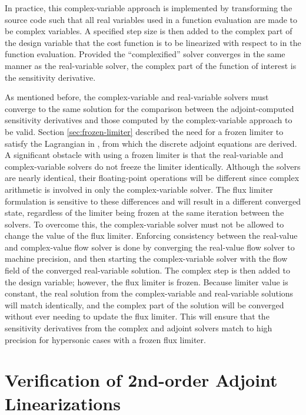 In practice, this complex-variable approach is implemented by transforming the
source code such that all real variables used in a function evaluation are made
to be complex variables.  A specified step size is then added to the complex
part of the design variable that the cost function is to be linearized with
respect to in the function evaluation.  Provided the ``complexified'' solver
converges in the same manner as the real-variable solver, the complex part of
the function of interest is the sensitivity derivative.

As mentioned before, the complex-variable and real-variable solvers must
converge to the same solution for the comparison between the adjoint-computed
sensitivity derivatives and those computed by the complex-variable approach to
be valid.  Section \ref{sec:frozen-limiter} described the need for a frozen
limiter to satisfy the Lagrangian in , from which the discrete
adjoint equations are derived.  A significant obstacle with using a frozen
limiter is that the real-variable and complex-variable solvers do not freeze the
limiter identically.  Although the solvers are nearly identical, their
floating-point operations will be different since complex arithmetic is involved
in only the complex-variable solver.  The flux limiter formulation is sensitive
to these differences and will result in a different converged state, regardless
of the limiter being frozen at the same iteration between the solvers.  To
overcome this, the complex-variable solver must not be allowed to change the
value of the flux limiter.  Enforcing consistency between the real-value and
complex-value flow solver is done by converging the real-value flow solver to
machine precision, and then starting the complex-variable solver with the flow
field of the converged real-variable solution.  The complex step is then added
to the design variable; however, the flux limiter is frozen.  Because limiter
value is constant, the real solution from the complex-variable and real-variable
solutions will match identically, and the complex part of the solution will be
converged without ever needing to update the flux limiter.  This will ensure
that the sensitivity derivatives from the complex and adjoint solvers match to
high precision for hypersonic cases with a frozen flux limiter.

\section{Verification of 2nd-order Adjoint Linearizations}

